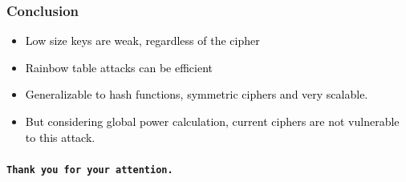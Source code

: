 \documentclass{beamer}
\newcommand{\alertor}[1]{\textcolor{orange}{#1}}
\newenvironment{myfancyblock}%
{\begin{center}\begin{tikzpicture}}%
{\end{tikzpicture}\end{center}}%
\newcommand{\opaqueblock}[4]{
    \node[#2=#3] (X) {#4};
}
\begin{document}
\begin{frame}
    \frametitle{Conclusion}

    \begin{itemize}
        \item \textcolor{black}{Low size keys are weak, regardless of the cipher}
        \item \textcolor{black}{Rainbow table attacks can be efficient}
        \item \textcolor{black}{Generalizable to hash functions, symmetric ciphers and very scalable.}
	\item \textcolor{black}{But considering global power calculation, current ciphers are not vulnerable to this attack.}
    \end{itemize}

\end{frame}


\begin{frame}
    \frametitle{}
    \begin{center}
        {\Huge\bf\tt Thank you for your attention.}
    \end{center}
\end{frame}


%
%
%
%
%
\end{document}

